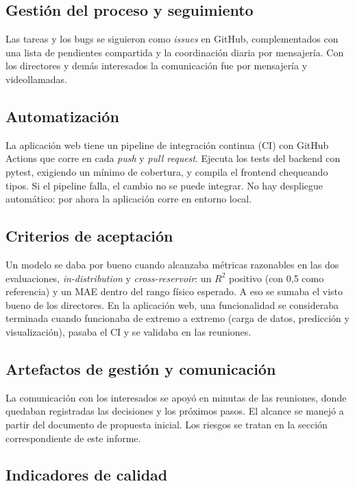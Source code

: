 \documentclass[12pt,a4paper]{article}
\begin{document}
\subsection{Gestión del proceso y seguimiento}

Las tareas y los bugs se siguieron como \textit{issues} en GitHub, complementados con una
lista de pendientes compartida y la coordinación diaria por mensajería. Con los directores
y demás interesados la comunicación fue por mensajería y videollamadas.

\subsection{Automatización}

La aplicación web tiene un pipeline de integración continua (CI) con GitHub Actions que
corre en cada \textit{push} y \textit{pull request}. Ejecuta los tests del backend con
pytest, exigiendo un mínimo de cobertura, y compila el frontend chequeando tipos. Si el
pipeline falla, el cambio no se puede integrar. No hay despliegue automático: por ahora la
aplicación corre en entorno local.

\subsection{Criterios de aceptación}

Un modelo se daba por bueno cuando alcanzaba métricas razonables en las dos evaluaciones,
\textit{in-distribution} y \textit{cross-reservoir}: un $R^2$ positivo (con 0,5 como
referencia) y un MAE dentro del rango físico esperado. A eso se sumaba el visto bueno de
los directores. En la aplicación web, una funcionalidad se consideraba terminada cuando
funcionaba de extremo a extremo (carga de datos, predicción y visualización), pasaba el CI
y se validaba en las reuniones.

\subsection{Artefactos de gestión y comunicación}

La comunicación con los interesados se apoyó en minutas de las reuniones, donde quedaban
registradas las decisiones y los próximos pasos. El alcance se manejó a partir del
documento de propuesta inicial. Los riesgos se tratan en la sección correspondiente de
este informe.

\subsection{Indicadores de calidad}
\end{document}
